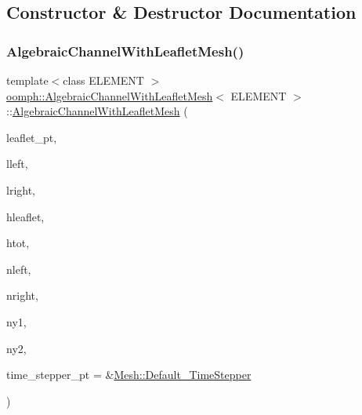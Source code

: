 \subsection{Constructor \& Destructor Documentation}
\mbox{\label{classoomph_1_1AlgebraicChannelWithLeafletMesh_a1e72e11c9971ed132efc95b808c83ccd}} 
\subsubsection{\texorpdfstring{Algebraic\+Channel\+With\+Leaflet\+Mesh()}{AlgebraicChannelWithLeafletMesh()}}
{\footnotesize\ttfamily template$<$class E\+L\+E\+M\+E\+NT $>$ \\
\hyperlink{classoomph_1_1AlgebraicChannelWithLeafletMesh}{oomph\+::\+Algebraic\+Channel\+With\+Leaflet\+Mesh}$<$ E\+L\+E\+M\+E\+NT $>$\+::\hyperlink{classoomph_1_1AlgebraicChannelWithLeafletMesh}{Algebraic\+Channel\+With\+Leaflet\+Mesh} (\begin{DoxyParamCaption}\item[{\hyperlink{classoomph_1_1GeomObject}{Geom\+Object} $\ast$}]{leaflet\+\_\+pt,  }\item[{const double \&}]{lleft,  }\item[{const double \&}]{lright,  }\item[{const double \&}]{hleaflet,  }\item[{const double \&}]{htot,  }\item[{const unsigned \&}]{nleft,  }\item[{const unsigned \&}]{nright,  }\item[{const unsigned \&}]{ny1,  }\item[{const unsigned \&}]{ny2,  }\item[{\hyperlink{classoomph_1_1TimeStepper}{Time\+Stepper} $\ast$}]{time\+\_\+stepper\+\_\+pt = {\ttfamily \&\hyperlink{classoomph_1_1Mesh_a12243d0fee2b1fcee729ee5a4777ea10}{Mesh\+::\+Default\+\_\+\+Time\+Stepper}} }\end{DoxyParamCaption})\hspace{0.3cm}{\ttfamily [inline]}}



